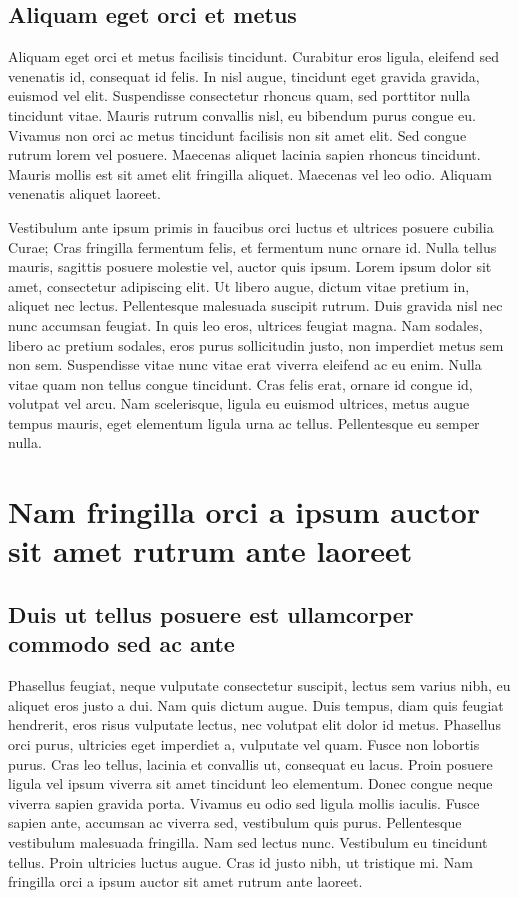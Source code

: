 \documentclass{EPUProjetDi}
\begin{document}
\section{Aliquam eget orci et metus}

Aliquam eget orci et metus facilisis tincidunt. Curabitur eros ligula, eleifend sed venenatis id, consequat id felis. In nisl augue, tincidunt eget gravida gravida, euismod vel elit. Suspendisse consectetur rhoncus quam, sed porttitor nulla tincidunt vitae. Mauris rutrum convallis nisl, eu bibendum purus congue eu. Vivamus non orci ac metus tincidunt facilisis non sit amet elit. Sed congue rutrum lorem vel posuere. Maecenas aliquet lacinia sapien rhoncus tincidunt. Mauris mollis est sit amet elit fringilla aliquet. Maecenas vel leo odio. Aliquam venenatis aliquet laoreet.

Vestibulum ante ipsum primis in faucibus orci luctus et ultrices posuere cubilia Curae; Cras fringilla fermentum felis, et fermentum nunc ornare id. Nulla tellus mauris, sagittis posuere molestie vel, auctor quis ipsum. Lorem ipsum dolor sit amet, consectetur adipiscing elit. Ut libero augue, dictum vitae pretium in, aliquet nec lectus. Pellentesque malesuada suscipit rutrum. Duis gravida nisl nec nunc accumsan feugiat. In quis leo eros, ultrices feugiat magna. Nam sodales, libero ac pretium sodales, eros purus sollicitudin justo, non imperdiet metus sem non sem. Suspendisse vitae nunc vitae erat viverra eleifend ac eu enim. Nulla vitae quam non tellus congue tincidunt. Cras felis erat, ornare id congue id, volutpat vel arcu. Nam scelerisque, ligula eu euismod ultrices, metus augue tempus mauris, eget elementum ligula urna ac tellus. Pellentesque eu semper nulla.

\chapter{Nam fringilla orci a ipsum auctor sit amet rutrum ante laoreet}

\section{Duis ut tellus posuere est ullamcorper commodo sed ac ante}

Phasellus feugiat, neque vulputate consectetur suscipit, lectus sem varius nibh, eu aliquet eros justo a dui. Nam quis dictum augue. Duis tempus, diam quis feugiat hendrerit, eros risus vulputate lectus, nec volutpat elit dolor id metus. Phasellus orci purus, ultricies eget imperdiet a, vulputate vel quam. Fusce non lobortis purus. Cras leo tellus, lacinia et convallis ut, consequat eu lacus. Proin posuere ligula vel ipsum viverra sit amet tincidunt leo elementum. Donec congue neque viverra sapien gravida porta. Vivamus eu odio sed ligula mollis iaculis. Fusce sapien ante, accumsan ac viverra sed, vestibulum quis purus. Pellentesque vestibulum malesuada fringilla. Nam sed lectus nunc. Vestibulum eu tincidunt tellus. Proin ultricies luctus augue. Cras id justo nibh, ut tristique mi. Nam fringilla orci a ipsum auctor sit amet rutrum ante laoreet.
\end{document}
